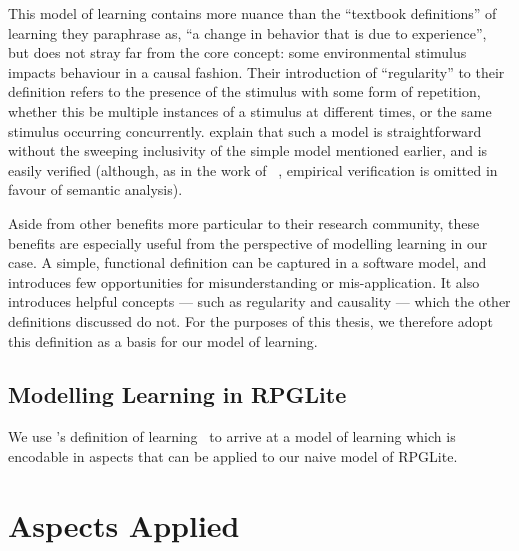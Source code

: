 This model of learning contains more nuance than the ``textbook definitions'' of
learning they paraphrase as, ``a change in behavior that is due to experience'',
but does not stray far from the core concept: some environmental stimulus
impacts behaviour in a causal fashion. Their introduction of ``regularity'' to
their definition refers to the presence of the stimulus with some form of
repetition, whether this be multiple instances of a stimulus at different times,
or the same stimulus occurring concurrently. \citeauthor{de2013learning} explain
that such a model is straightforward without the sweeping inclusivity of the
simple model mentioned earlier, and is easily verified (although, as in the work
of \citeauthor{lachman1997learning}~\cite{lachman1997learning}, empirical
verification is omitted in favour of semantic analysis).

Aside from other benefits more particular to their research community, these
benefits are especially useful from the perspective of modelling learning in our
case. A simple, functional definition can be captured in a software model, and
introduces few opportunities for misunderstanding or mis-application. It also
introduces helpful concepts --- such as regularity and causality --- which the
other definitions discussed do not. For the purposes of this thesis, we
therefore adopt this definition as a basis for our model of learning.

\subsection{Modelling Learning in RPGLite}

We use \citeauthor{de2013learning}'s definition of
learning~\cite{de2013learning} to arrive at a model of learning which is
encodable in aspects that can be applied to our naive model of RPGLite.



\section{Aspects Applied}\label{sec:optimisation_with_aspects_aspectsdeveloped}




